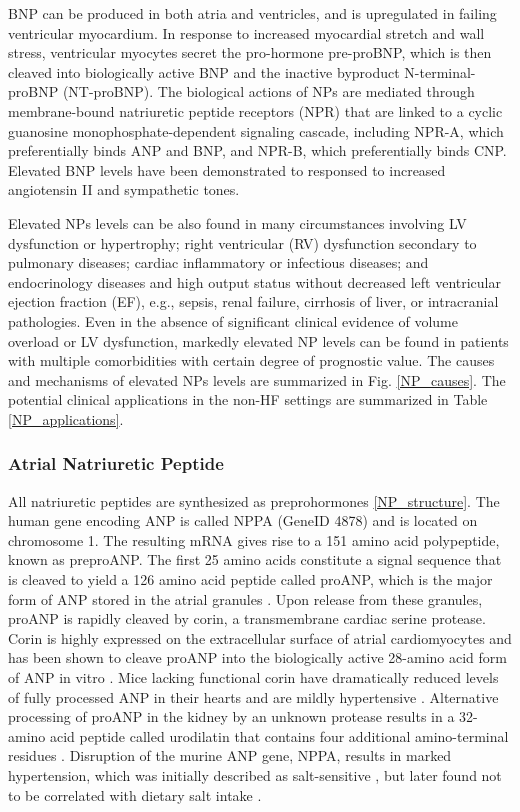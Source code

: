\documentclass[14pt,a4paper,onecolumn]{extarticle}
\begin{document}
BNP can be produced in both atria and ventricles, and is upregulated in failing ventricular myocardium. In response to increased myocardial stretch and wall stress, ventricular myocytes secret the pro-hormone pre-proBNP, which is then cleaved into biologically active BNP and the inactive byproduct N-terminal-proBNP (NT-proBNP). The biological actions of NPs are mediated through membrane-bound natriuretic peptide receptors (NPR) that are linked to a cyclic guanosine monophosphate-dependent signaling cascade, including NPR-A, which preferentially binds ANP and BNP, and NPR-B, which preferentially binds CNP. Elevated BNP levels have been demonstrated to responsed to increased angiotensin II and sympathetic tones. \citep{Iwanaga2006}

Elevated NPs levels can be also found in many circumstances involving LV dysfunction or hypertrophy; right ventricular (RV) dysfunction secondary to pulmonary diseases; cardiac inflammatory or infectious diseases; and endocrinology diseases and high output status without decreased left ventricular ejection fraction (EF), e.g., sepsis, renal failure, cirrhosis of liver, or intracranial pathologies. Even in the absence of significant clinical evidence of volume overload or LV dysfunction, markedly elevated NP levels can be found in patients with multiple comorbidities with certain degree of prognostic value. The causes and mechanisms of elevated NPs levels are summarized in Fig. \ref{NP_causes}. The potential clinical applications in the non-HF settings are summarized in Table \ref{NP_applications}.

\subsubsection{Atrial Natriuretic Peptide}

All natriuretic peptides are synthesized as preprohormones \ref{NP_structure}.
The human gene encoding ANP is called NPPA (GeneID 4878) and is located on chromosome 1. The resulting mRNA gives rise to a 151 amino acid polypeptide, known as preproANP. The first 25 amino acids constitute a signal sequence that is cleaved to yield a 126 amino acid peptide called proANP, which is the major form of ANP stored in the atrial granules \citep{Oikawa1984}.
Upon release from these granules, proANP is rapidly cleaved by corin, a transmembrane cardiac serine protease. Corin is highly expressed on the extracellular surface of atrial cardiomyocytes and has been shown to cleave proANP into the biologically active 28-amino acid form of ANP in vitro \citep{Yan2000}.
Mice lacking functional corin have dramatically reduced levels of fully processed ANP in their hearts and are mildly hypertensive \citep{Chan2005}.
Alternative processing of proANP in the kidney by an unknown protease results in a 32-amino acid peptide called urodilatin that contains four additional amino-terminal residues \citep{Forssmann1998}.
Disruption of the murine ANP gene, NPPA, results in marked hypertension, which was initially described as salt-sensitive \citep{John1995}, but later found not to be correlated with dietary salt intake \citep{John1996}.
\end{document}
